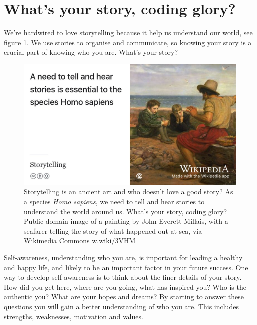 \documentclass[
]{book}
\begin{document}
\hypertarget{story}{%
\section{What's your story, coding glory?}\label{story}}

We're hardwired to love storytelling because it help us understand our world, see figure \ref{fig:storytelling-fig}. We use stories to organise and communicate, so knowing your story is a crucial part of knowing who you are. What's your story?

\begin{figure}

{\centering \includegraphics[width=1\linewidth]{images/storytelling} 

}

\caption{\href{https://en.wikipedia.org/wiki/Storytelling}{Storytelling} is an ancient art and who doesn't love a good story? As a species \emph{Homo sapiens}, we need to tell and hear stories to understand the world around us. What's your story, coding glory? Public domain image of a painting by John Everett Millais, with a seafarer telling the story of what happened out at sea, via Wikimedia Commons \href{https://w.wiki/3VHM}{w.wiki/3VHM}}\label{fig:storytelling-fig}
\end{figure}



Self-awareness, understanding who you are, is important for leading a healthy and happy life, and likely to be an important factor in your future success. One way to develop self-awareness is to think about the finer details of your story. \citep{freeyourstory} How did you get here, where are you going, what has inspired you? Who is the authentic you? \citep{regrets} What are your hopes and dreams? By starting to answer these questions you will gain a better understanding of who you are. This includes strengths, weaknesses, motivation and values. \citep{parachute2020}
\end{document}
